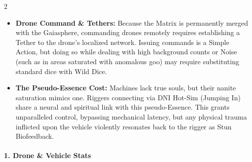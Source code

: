 \documentclass[
  oneside]{article}
\providecommand{\tightlist}{%
  \setlength{\itemsep}{0pt}\setlength{\parskip}{0pt}}
\begin{document}
\begin{multicols}{2}
\begin{itemize}
\tightlist
\item
  \textbf{Drone Command \& Tethers:} Because the
  Matrix is permanently merged with the
  Gaiasphere, commanding drones remotely requires
  establishing a Tether to the drone's localized
  network. Issuing commands is a Simple Action,
  but doing so while dealing with high background
  counts or Noise (such as in areas saturated with
  anomalous goo) may require substituting standard
  dice with Wild Dice.
\item
  \textbf{The Pseudo-Essence Cost:} Machines lack
  true souls, but their nanite saturation mimics
  one. Riggers connecting via DNI Hot-Sim (Jumping
  In) share a neural and spiritual link with this
  pseudo-Essence. This grants unparalleled
  control, bypassing mechanical latency, but any
  physical trauma inflicted upon the vehicle
  violently resonates back to the rigger as Stun
  Biofeedback.
\end{itemize}

\hypertarget{drone-vehicle-stats}{%
\paragraph{1. Drone \& Vehicle
Stats}\label{drone-vehicle-stats}}

\end{multicols}
\end{document}
